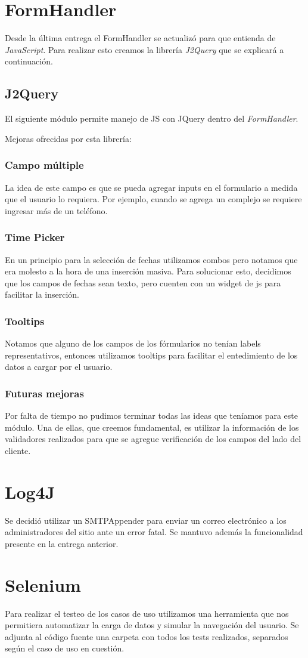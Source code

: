 \documentclass[a4paper,11pt]{article}
\begin{document}
\section{FormHandler}
Desde la última entrega el FormHandler se actualizó para que entienda de
\textit{JavaScript}. Para realizar esto creamos la librería \emph{J2Query}
que se explicará a continuación.

\subsection{J2Query}
El siguiente módulo permite manejo de JS con JQuery dentro del
\textit{FormHandler}.

Mejoras ofrecidas por esta librería:
\subsubsection{Campo múltiple}
La idea de este campo es que se pueda agregar inputs en el formulario
a medida que el usuario lo requiera. Por ejemplo, cuando se agrega
un complejo se requiere ingresar más de un teléfono.

\subsubsection{Time Picker}
En un principio para la selección de fechas utilizamos combos pero notamos
que era molesto a la hora de una inserción masiva. Para solucionar esto,
decidimos que los campos de fechas sean texto, pero cuenten con un
widget de js para facilitar la inserción.

\subsubsection{Tooltips}
Notamos que alguno de los campos de los fórmularios no tenían labels
representativos, entonces utilizamos tooltips para facilitar el entedimiento
de los datos a cargar por el usuario.

\subsubsection{Futuras mejoras}
Por falta de tiempo no pudimos terminar todas las ideas que teníamos para
este módulo. Una de ellas, que creemos fundamental, es utilizar la información
de los validadores realizados para que se agregue verificación de los campos
del lado del cliente.

\section{Log4J}
Se decidió utilizar un SMTPAppender para enviar un correo electrónico a los
administradores del sitio ante un error fatal. Se mantuvo además la funcionalidad
presente en la entrega anterior.

\section{Selenium}
Para realizar el testeo de los casos de uso utilizamos una herramienta que nos permitiera
automatizar la carga de datos y simular la navegación del usuario.
Se adjunta al código fuente una carpeta con todos los tests realizados, separados según
el caso de uso en cuestión.
\end{document}
